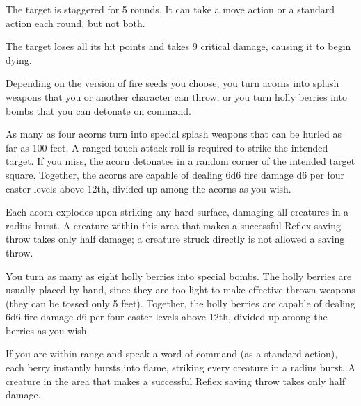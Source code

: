 \spellrng{\rngclose}
\begin{spellhealthy}
  The target is staggered for 5 rounds. It can take a move action or a standard action each round, but not both.
\end{spellhealthy}
\begin{spellblood}
  The target loses all its hit points and takes 9 critical damage, causing it to begin dying.
\end{spellblood}

\spellrng{\rngtouch}
\begin{spelleffect}
  Depending on the version of fire seeds you choose, you turn acorns into splash weapons that you or another character can throw, or you turn holly berries into bombs that you can detonate on command.
  \par {} As many as four acorns turn into special splash weapons that can be hurled as far as 100 feet. A ranged touch attack roll is required to strike the intended target. If you miss, the acorn detonates in a random corner of the intended target square. Together, the acorns are capable of dealing 6d6 fire damage \add d6 per four caster levels above 12th, divided up among the acorns as you wish.
  \par Each acorn explodes upon striking any hard surface, damaging all creatures in a \areasmall radius burst. A creature within this area that makes a successful Reflex saving throw takes only half damage; a creature struck directly is not allowed a saving throw.
  \par {} You turn as many as eight holly berries into special bombs. The holly berries are usually placed by hand, since they are too light to make effective thrown weapons (they can be tossed only 5 feet). Together, the holly berries are capable of dealing 6d6 fire damage \add d6 per four caster levels above 12th, divided up among the berries as you wish.
  \par If you are within \rngmed range and speak a word of command (as a standard action), each berry instantly bursts into flame, striking every creature in a \areamed radius burst. A creature in the area that makes a successful Reflex saving throw takes only half damage.
\end{spelleffect}
